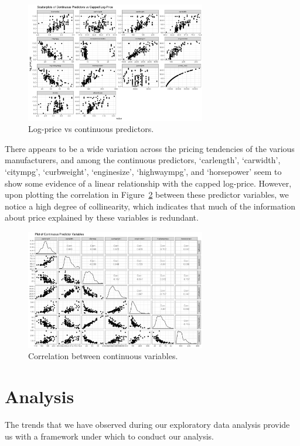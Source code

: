 \documentclass[a4paper, 10pt, titlepage]{article}
\begin{document}
	\begin{figure}[!ht]
	\centering
	    \includegraphics[width = 0.7\textwidth]{images/resp_scatter.png}
	\caption{Log-price vs continuous predictors.}
	\label{figure:resp scatter}
    \end{figure}
    
There appears to be a wide variation across the pricing tendencies of the various manufacturers, and among the continuous predictors, `carlength', `carwidth', `citympg', `curbweight', `enginesize', `highwaympg', and `horsepower' seem to show some evidence of a linear relationship with the capped log-price. However, upon plotting the correlation in Figure~\ref{figure:conts coll} between these predictor variables, we notice a high degree of collinearity, which indicates that much of the information about price explained by these variables is redundant.

	\begin{figure}[!ht]
	\centering
	    \includegraphics[width = 0.7\textwidth]{images/conts_var_pairs.png}
	\caption{Correlation between continuous variables.}
	\label{figure:conts coll}
    \end{figure}

\section{Analysis}
The trends that we have observed during our exploratory data analysis provide us with a framework under which to conduct our analysis.
\end{document}
